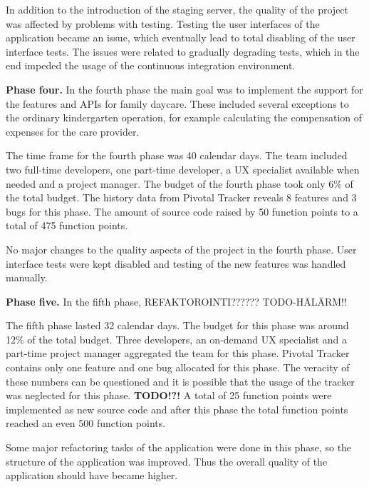 In addition to the introduction of the staging server, the quality of the project was affected by problems with testing. Testing the user interfaces of the application became an issue, which eventually lead to total disabling of the user interface tests. The issues were related to gradually degrading tests, which in the end impeded the usage of the continuous integration environment.

\textbf{Phase four.} In the fourth phase the main goal was to implement the support for the features and APIs for family daycare. These included several exceptions to the ordinary kindergarten operation, for example calculating the compensation of expenses for the care provider.

The time frame for the fourth phase was 40 calendar days. The team included two full-time developers, one part-time developer, a UX specialist available when needed and a project manager. The budget of the fourth phase took only 6\% of the total budget. The history data from Pivotal Tracker reveals 8 features and 3 bugs for this phase. The amount of source code raised by 50 function points to a total of 475 function points.

No major changes to the quality aspects of the project in the fourth phase. User interface tests were kept disabled and testing of the new features was handled manually.


\textbf{Phase five.} In the fifth phase, REFAKTOROINTI?????? TODO-HÄLÄRM!!


The fifth phase lasted 32 calendar days. The budget for this phase was around 12\% of the total budget. Three developers, an on-demand UX specialist and a part-time project manager aggregated the team for this phase. Pivotal Tracker contains only one feature and one bug allocated for this phase. The veracity of these numbers can be questioned and it is possible that the usage of the tracker was neglected for this phase. \textbf{TODO!?!} A total of 25 function points were implemented as new source code and after this phase the total function points reached an even 500 function points. 

Some major refactoring tasks of the application were done in this phase, so the structure of the application was improved. Thus the overall quality of the application should have became higher.

